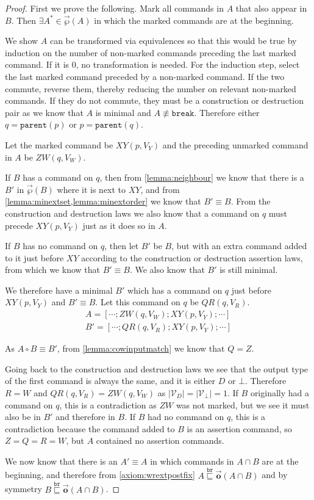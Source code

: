 \documentclass[12pt]{article}
\newcommand{\setvx}[1]{\mathcal{V}_{#1}}
\newcommand{\setd}{\setvx{D}}
\newcommand{\setb}{\setvx{\empt}}
\newcommand{\empt}{\bot}
\newcommand{\parent}{\mathtt{parent}}
\newcommand{\cbrk}{\mathtt{break}}
\newcommand{\fscommand}[2]{{#1#2}}
\newcommand{\cxy}{\fscommand{X}{Y}}
\newcommand{\czw}{\fscommand{Z}{W}}
\newcommand{\cqr}{\fscommand{Q}{R}}
\newcommand{\nequiv}{\not\equiv}
\newcommand{\wrext}{\stackrel{\mathtt{br}}{\sqsubseteq}}
\newcommand{\coworks}{\circ}
\newcommand{\orderset}[1]{\vec{\wp}({#1})}
\newcommand{\ordered}[1]{\vec{\mathbf{o}}({#1})}
\theoremstyle{definition}
\begin{document}
\begin{proof}
First we prove the following.
Mark all commands in $A$ that also appear in $B$.
Then $\exists A^* \in \orderset{A}$ in which the marked commands are at the beginning.

\medskip

We show $A$ can be transformed via equivalences so that this would be true
by induction on the number of non-marked commands preceding the last marked command.
If it is 0, no transformation is needed.
For the induction step, select the last marked command preceded by a non-marked command.
If the two commute, reverse them, thereby reducing the number on relevant non-marked commands.
If they do not commute, they must be a construction or destruction pair as we know
that $A$ is minimal and $A\nequiv\cbrk$.
Therefore either $q=\parent(p)$ or $p=\parent(q)$.

Let the marked command be $\cxy(p, V_Y)$ and the preceding unmarked command in $A$ be $\czw(q, V_W)$.

If $B$ has a command on $q$, then
from \cref{lemma:neighbour}
we know that there is a $B'$ in $\orderset{B}$ where it is next to $\cxy$,
and from \cref{lemma:minextset,lemma:minextorder} we know that $B'\equiv B$.
From the construction and destruction laws we also know that a command on $q$
must precede $\cxy(p, V_Y)$ just as it does so in $A$.

If $B$ has no command on $q$, then let $B'$ be $B$, but with an extra command added to it just before $\cxy$
according to the construction or destruction assertion laws, from which we know
that $B'\equiv B$.
We also know that $B'$ is still minimal.

We therefore have a minimal $B'$ which has a command on $q$ just before $\cxy(p, V_Y)$ and $B'\equiv B$.
Let this command on $q$ be $\cqr(q, V_R)$.
\begin{gather*}
A = [\cdots; \czw(q, V_W); \cxy(p, V_Y); \cdots] \\
B' = [\cdots; \cqr(q, V_R); \cxy(p, V_Y); \cdots]
\end{gather*}

As $A\coworks B\equiv B'$, 
from \cref{lemma:cowinputmatch}
we know that $Q=Z$. 

Going back to the construction and destruction laws we see that the output type of the first command
is always the same, and it is either $D$ or $\empt$. Therefore $R=W$ and $\cqr(q, V_R)=\czw(q, V_W)$
as $|\setd|=|\setb|=1$. 
If $B$ originally had a command on $q$,
this is a contradiction as $\czw$ was not marked, but we see it must also be in $B'$ and therefore in $B$.
If $B$ had no command on $q$,
this is a contradiction because the command added to $B$ is an assertion command, so $Z=Q=R=W$, 
but $A$ contained no assertion commands.

\medskip

We now know that there is an $A'\equiv A$ in which commands in $A\cap B$
are at the beginning, and therefore 
from \cref{axiom:wrextpostfix}
$A\wrext \ordered{A\cap B}$ and by symmetry $B\wrext \ordered{A\cap B}$.
\end{proof}
\end{document}
